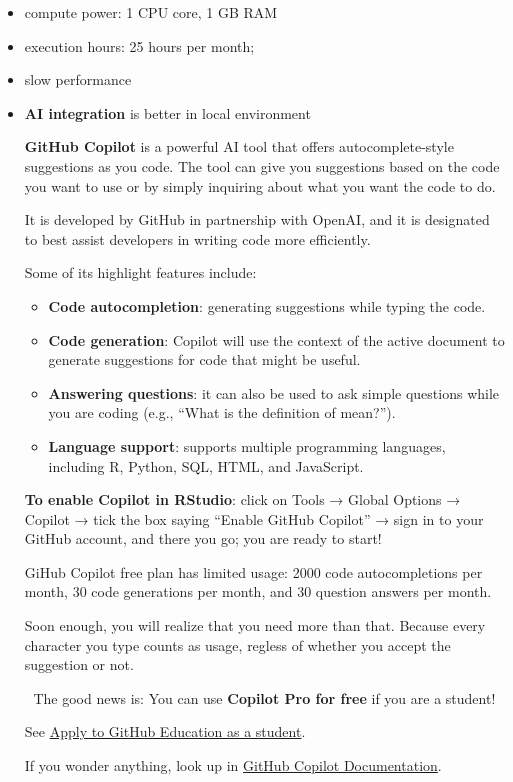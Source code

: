 \documentclass[
  12pt,
  letterpaper,
]{scrbook}
\providecommand{\tightlist}{%
  \setlength{\itemsep}{0pt}\setlength{\parskip}{0pt}}
\renewcommand{\tightlist}{\setlength{\itemsep}{0.5\baselineskip}\setlength{\parskip}{0.2\baselineskip}}
\theoremstyle{definition}
\theoremstyle{plain}
\theoremstyle{remark}
\begin{document}
\begin{itemize}
\item
  compute power: 1 CPU core, 1 GB RAM
\item
  execution hours: 25 hours per month;
\item
  slow performance
\item
  {\textbf{AI integration}} is better in local environment

  \textbf{GitHub Copilot} is a powerful AI tool that offers
  autocomplete-style suggestions as you code. The tool can give you
  suggestions based on the code you want to use or by simply inquiring
  about what you want the code to do.

  It is developed by GitHub in partnership with OpenAI, and it is
  designated to best assist developers in writing code more efficiently.

  Some of its highlight features include:

  \begin{itemize}
  \tightlist
  \item
    \textbf{Code autocompletion}: generating suggestions while typing
    the code.
  \item
    \textbf{Code generation}: Copilot will use the context of the active
    document to generate suggestions for code that might be useful.
  \item
    \textbf{Answering questions}: it can also be used to ask simple
    questions while you are coding (e.g., ``What is the definition of
    mean?'').
  \item
    \textbf{Language support}: supports multiple programming languages,
    including R, Python, SQL, HTML, and JavaScript.
  \end{itemize}

  \textbf{To enable Copilot in RStudio}: click on Tools → Global Options
  → Copilot → tick the box saying ``Enable GitHub Copilot'' → sign in to
  your GitHub account, and there you go; you are ready to start!

  GiHub Copilot free plan has limited usage: 2000 code autocompletions
  per month, 30 code generations per month, and 30 question answers per
  month.

  Soon enough, you will realize that you need more than that. Because
  every character you type counts as usage, regless of whether you
  accept the suggestion or not.

  🎈 The good news is: You can use \textbf{Copilot Pro for free} if you
  are a student!

  See
  \href{https://docs.github.com/en/education/explore-the-benefits-of-teaching-and-learning-with-github-education/github-education-for-students/apply-to-github-education-as-a-student}{Apply
  to GitHub Education as a student}.

  If you wonder anything, look up in
  \href{https://docs.github.com/en/copilot}{GitHub Copilot
  Documentation}.
\end{itemize}
\end{document}
